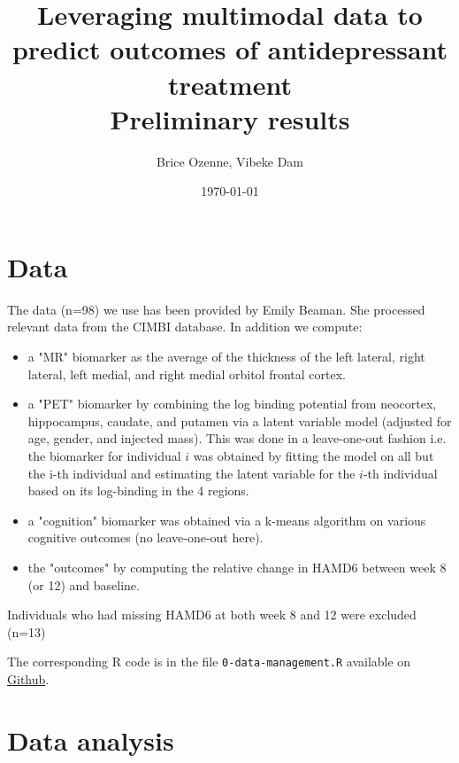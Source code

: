 \documentclass[12pt]{article}
\author{Brice Ozenne, Vibeke Dam}
\date{\today}
\title{Leveraging multimodal data to predict outcomes of antidepressant treatment\\\medskip
\large Preliminary results}
\begin{document}
\maketitle

\section{Data}
\label{sec:org6ea3379}

The data (n=98) we use has been provided by Emily Beaman. She processed
relevant data from the CIMBI database. In addition we compute:
\begin{itemize}
\item a "MR" biomarker as the average of the thickness of the left
lateral, right lateral, left medial, and right medial orbitol
frontal cortex.
\item a "PET" biomarker by combining the log binding potential from
neocortex, hippocampus, caudate, and putamen via a latent variable
model (adjusted for age, gender, and injected mass). This was done
in a leave-one-out fashion i.e. the biomarker for individual \(i\)
was obtained by fitting the model on all but the i-th individual and
estimating the latent variable for the \(i\)-th individual based on
its log-binding in the 4 regions.
\item a "cognition" biomarker was obtained via a k-means algorithm on
various cognitive outcomes (no leave-one-out here).
\item the "outcomes" by computing the relative change in HAMD6 between week 8 (or 12) and baseline.
\end{itemize}
Individuals who had missing HAMD6 at both week 8 and 12 were excluded (n=13)

\bigskip

The corresponding R code is in the file \texttt{0-data-management.R} available on \href{https://github.com/bozenne/article-predictionNP1BD3/code-data-analysis}{Github}.

\clearpage

\section{Data analysis}
\label{sec:orgc849712}
\end{document}

